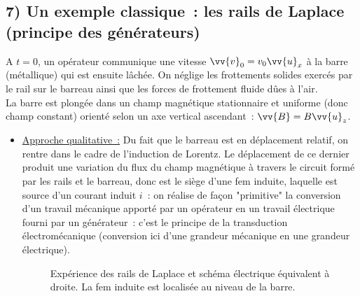 \documentclass{article}
\renewcommand\overrightarrow{\vv}
\begin{document}
\subsection*{7)  Un exemple classique : les rails de Laplace (principe des
générateurs)} A $t = 0$, un opérateur communique une
vitesse $\overrightarrow{v}_{0}=v_{0}\overrightarrow{u}_{x}$ à la
barre (métallique) qui est ensuite lâchée. On néglige les
frottements solides exercés par le rail sur le barreau ainsi que les
forces de frottement fluide dûes à
l'air. \\
La barre est plongée dans un champ magnétique stationnaire et
uniforme (donc champ constant) orienté selon un axe vertical
ascendant : $\overrightarrow{B}  =B\overrightarrow{u}_{z}$.
\begin{itemize}
\item \underline{Approche qualitative :} Du fait que le barreau est
en déplacement relatif, on rentre dans le cadre de l'induction de
Lorentz. Le déplacement de ce dernier produit une variation du flux
du champ magnétique à travers le circuit formé par les rails et le
barreau, donc est le siège d'une fem induite, laquelle est source
d'un courant induit $i$ : on réalise de façon "primitive" la
conversion d'un travail mécanique apporté par un opérateur en un
travail électrique fourni par un générateur : c'est le principe de
la transduction électromécanique (conversion ici d'une grandeur
mécanique en une grandeur électrique).

\begin{figure}[h]
\begin{center}
\end{center}
\caption{Expérience des rails de Laplace et schéma électrique
équivalent à droite. La fem induite est localisée au niveau de la
barre.}\label{Fig.4}
\end{figure}


\end{itemize}
\end{document}
